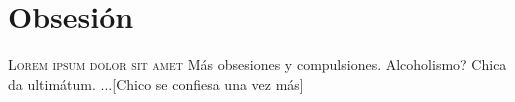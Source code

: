 

\chapter{Obsesión}
\lettrine{L}{orem ipsum dolor sit amet} Más obsesiones y compulsiones. Alcoholismo? Chica da ultimátum.
...[Chico se confiesa una vez más]